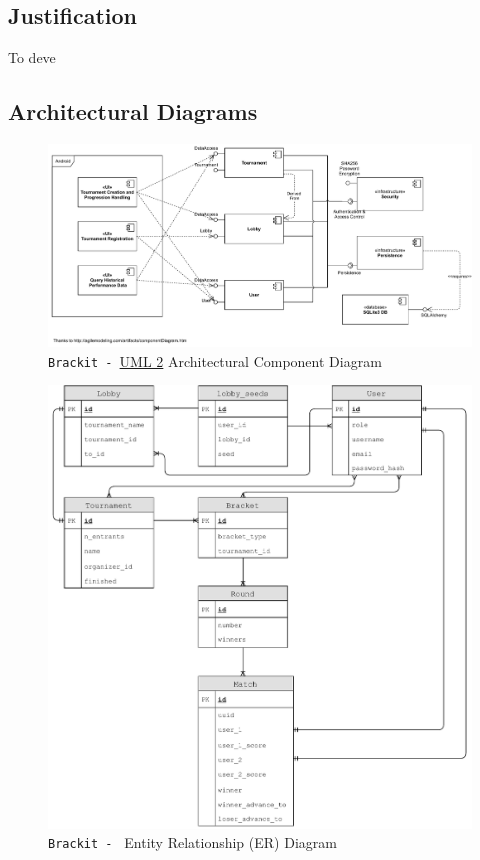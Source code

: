 \documentclass{article}
\begin{document}
\subsection{Justification}
To deve
\clearpage
\subsection{Architectural Diagrams}
\vfill
\begin{center}
    \begin{figure}[htp]
        \centering
        \includegraphics[width=18cm]{../diagrams/component_diag.pdf}
        \caption{\texttt{Brackit - }\href{https://sparxsystems.com/resources/tutorials/uml2/index.html}{UML 2} Architectural Component Diagram}
        \end{figure}
\end{center}
\vfill

\begin{center}
    \begin{figure}[h]
        \centering
        \includegraphics[width=19cm]{../diagrams/er.pdf}
        \caption{\texttt{Brackit - } Entity Relationship (ER) Diagram}
        \end{figure}
\end{center}
\clearpage
\end{document}

